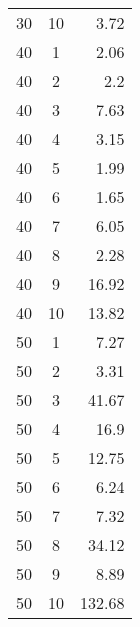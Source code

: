 \documentclass[13pt, letterpaper, oneside]{book}
\begin{document}
\begin{multicols}{4}
\begin{tabular}{c c r}
30 & 10 & 3.72 \\
40 & 1 & 2.06 \\
40 & 2 & 2.2 \\
40 & 3 & 7.63 \\
40 & 4 & 3.15 \\
40 & 5 & 1.99 \\
40 & 6 & 1.65 \\
40 & 7 & 6.05 \\
40 & 8 & 2.28 \\
40 & 9 & 16.92 \\
40 & 10 & 13.82 \\
50 & 1 & 7.27 \\
50 & 2 & 3.31 \\
50 & 3 & 41.67 \\
50 & 4 & 16.9 \\
50 & 5 & 12.75 \\
50 & 6 & 6.24 \\
50 & 7 & 7.32 \\
50 & 8 & 34.12 \\
50 & 9 & 8.89 \\
50 & 10 & 132.68 \\
\bottomrule
\end{tabular}
\end{multicols}


\backmatter
\pagebreak
\thispagestyle{empty}
\vspace*{\fill}
\end{document}
